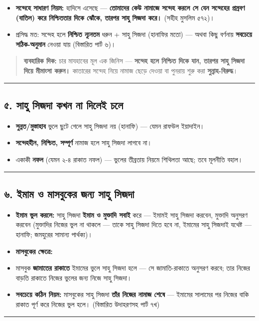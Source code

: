 \begin{itemize}
\item \textbf{সন্দেহে সাধারণ নিয়ম:} হাদিসে এসেছে — \textbf{তোমাদের কেউ নামাজে সন্দেহ করলে সে যেন সন্দেহের প্রস্রবণ (বাতিল) করে নিশ্চিততার দিকে ঝোঁকে, তারপর সাহু সিজদা করে।} (সহীহ মুসলিম ৫৭২)।
\item প্রসিদ্ধ মত: সন্দেহ হলে \textbf{নিশ্চিত ন্যূনতম} ধরুন + সাহু সিজদা (হানাফির মতো) — অথবা কিছু বর্ণনায় \textbf{সবচেয়ে সঠিক-অনুমান} নেওয়া যায় (বিস্তারিত পার্ট ৬)।
\end{itemize}
\begin{quote}
\textbf{ব্যবহারিক দিক:} চার মাযহাবের মূল এক জিনিস — \textbf{সন্দেহ হলে নিশ্চিত দিকে যান, তারপর সাহু সিজদা দিয়ে মীমাংসা করুন।} কাতারের সন্দেহ নিয়ে নামাজ ছেড়ে দেওয়া বা পুনরায় শুরু করা \textbf{সুন্নাহ-বিরুদ্ধ}।
\end{quote}

\medskip\hrule\medskip

\subsection*{৫. সাহু সিজদা কখন \textbf{না} দিলেই চলে}

\begin{itemize}
\item \textbf{সুন্নত/মুস্তাহাব} ভুলে ছুটে গেলে সাহু সিজদা নয় (হানাফি) — যেমন রাফউল ইয়াদাইন।
\item \textbf{সন্দেহহীন, নিশ্চিত, সম্পূর্ণ} নামাজ হলে সাহু সিজদা লাগবে না।
\item একাকী \textbf{নফল} (যেমন ২-৪ রাকাত নফল) — ভুলের তীব্রতায় নিয়মে শিথিলতা আছে; তবে মূলনীতি বহাল।
\end{itemize}
\medskip\hrule\medskip

\subsection*{৬. ইমাম ও মাসবুকের জন্য সাহু সিজদা}

\begin{itemize}
\item \textbf{ইমাম ভুল করলে:} সাহু সিজদা \textbf{ইমাম ও মুক্তাদি সবাই} করে — ইমামই সাহু সিজদা করবেন, মুক্তাদি অনুসরণ করবেন (মুক্তাদির নিজের ভুল না থাকলে — তাকে সাহু সিজদা দিতে হবে না, ইমামের সাহু সিজদাই যথেষ্ট — হানাফি; জমহুরের সামান্য পার্থক্য)।
\item \textbf{মাসবুকের ক্ষেত্রে:}
\item মাসবুক \textbf{জামাতের রাকাতে} ইমামের ভুলে সাহু সিজদা হলে — সে জামাতি-রাকাতে অনুসরণ করবে; তার নিজের বাড়তি রাকাতে নিজের ভুলের জন্য নিজে সাহু সিজদা।
\item \textbf{সবচেয়ে কঠিন নিয়ম:} মাসবুকের সাহু সিজদা \textbf{তাঁর নিজের নামাজ শেষে} — ইমামের সালামের পর নিজের বাকি রাকাত পূর্ণ করে নিজের ভুল হলে। (বিস্তারিত উদাহরণসহ পার্ট ৭খ)
\end{itemize}
\medskip\hrule\medskip

